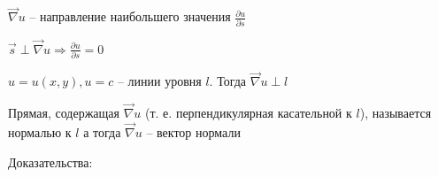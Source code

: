 \documentclass[12pt]{article}
\begin{document}
    \begin{MyTheorem}
         $\vec\nabla u$ -- направление наибольшего значения $\frac{\partial u}{\partial s}$
    \end{MyTheorem}

    \begin{MyTheorem}
         $\vec{s} \perp \vec\nabla u \Longrightarrow \frac{\partial u}{\partial s} = 0$
    \end{MyTheorem}

    \begin{MyTheorem}
         $u = u(x, y), u = c$ -- линии уровня $l$. Тогда $\vec\nabla u \perp l$

        Прямая, содержащая $\vec\nabla u$ (т. е. перпендикулярная касательной к $l$), называется нормалью к $l$
        а тогда $\vec\nabla u$ -- вектор нормали
    \end{MyTheorem}

    Доказательства:
\end{document}
